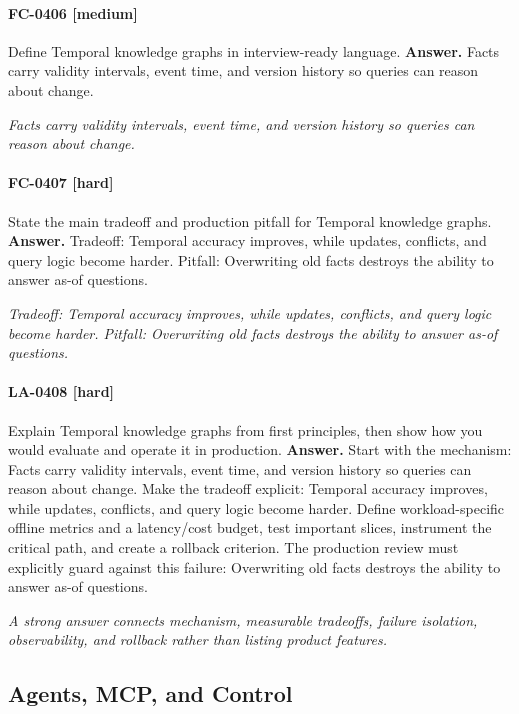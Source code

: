 \paragraph{FC-0406 [medium]} Define Temporal knowledge graphs in interview-ready language.
\noindent\textbf{Answer.} Facts carry validity intervals, event time, and version history so queries can reason about change.
\par\textit{Facts carry validity intervals, event time, and version history so queries can reason about change.}
\paragraph{FC-0407 [hard]} State the main tradeoff and production pitfall for Temporal knowledge graphs.
\noindent\textbf{Answer.} Tradeoff: Temporal accuracy improves, while updates, conflicts, and query logic become harder. Pitfall: Overwriting old facts destroys the ability to answer as-of questions.
\par\textit{Tradeoff: Temporal accuracy improves, while updates, conflicts, and query logic become harder. Pitfall: Overwriting old facts destroys the ability to answer as-of questions.}
\paragraph{LA-0408 [hard]} Explain Temporal knowledge graphs from first principles, then show how you would evaluate and operate it in production.
\noindent\textbf{Answer.} Start with the mechanism: Facts carry validity intervals, event time, and version history so queries can reason about change. Make the tradeoff explicit: Temporal accuracy improves, while updates, conflicts, and query logic become harder. Define workload-specific offline metrics and a latency/cost budget, test important slices, instrument the critical path, and create a rollback criterion. The production review must explicitly guard against this failure: Overwriting old facts destroys the ability to answer as-of questions.
\par\textit{A strong answer connects mechanism, measurable tradeoffs, failure isolation, observability, and rollback rather than listing product features.}
\subsection{Agents, MCP, and Control}
